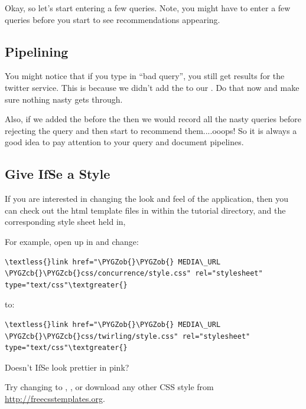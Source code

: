 \documentclass[letterpaper,10pt,english]{sphinxmanual}
\def\PYGZob{\char`\{}
\def\PYGZcb{\char`\}}
\begin{document}
Okay, so let's start entering a few queries. Note, you might have to enter a few queries before you start to see recommendations appearing.


\subsection{Pipelining}
\label{ifse-tutorial:pipelining}
You might notice that if you type in ``bad query'', you still get results for the twitter service. This is because we didn't add the  to our . Do that now and make sure nothing nasty gets through.

Also, if we added the  before the  then we would record all the nasty queries before rejecting the query and then start to recommend them....ooops! So it is always a good idea to pay attention to your query and document pipelines.


\subsection{Give IfSe a Style}
\label{ifse-tutorial:give-ifse-a-style}
If you are interested in changing the look and feel of the application, then you can check out the html template files in  within the tutorial directory, and the corresponding style sheet held in, 

For example, open up  in  and change:

\begin{Verbatim}[commandchars=\\\{\}]
\textless{}link href="\PYGZob{}\PYGZob{} MEDIA\_URL \PYGZcb{}\PYGZcb{}css/concurrence/style.css" rel="stylesheet"  type="text/css"\textgreater{}
\end{Verbatim}

to:

\begin{Verbatim}[commandchars=\\\{\}]
\textless{}link href="\PYGZob{}\PYGZob{} MEDIA\_URL \PYGZcb{}\PYGZcb{}css/twirling/style.css" rel="stylesheet"  type="text/css"\textgreater{}
\end{Verbatim}

Doesn't IfSe look prettier in pink?

Try changing  to , ,  or download any other CSS style from
\href{http://freecsstemplates.org}{http://freecsstemplates.org}.
\end{document}
